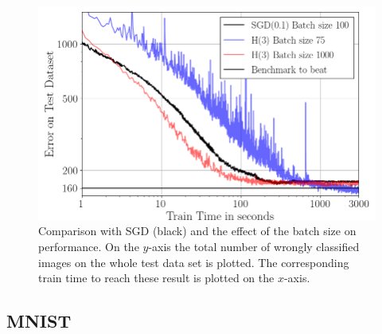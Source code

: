 \documentclass[conference]{IEEEtran}
\begin{document}
	\begin{figure}[htbp]
		\centerline{\includegraphics[scale=0.52]{Plot_Batch_size.png}}
		\caption{Comparison with SGD (black) and the effect of the batch size on performance. On the $y$-axis the total number of wrongly classified images on the whole test data set is plotted. The corresponding train time to reach these result is plotted on the $x$-axis.}
		\label{fig3}
	\end{figure}
	
	\subsection{MNIST}
	
\end{document}
